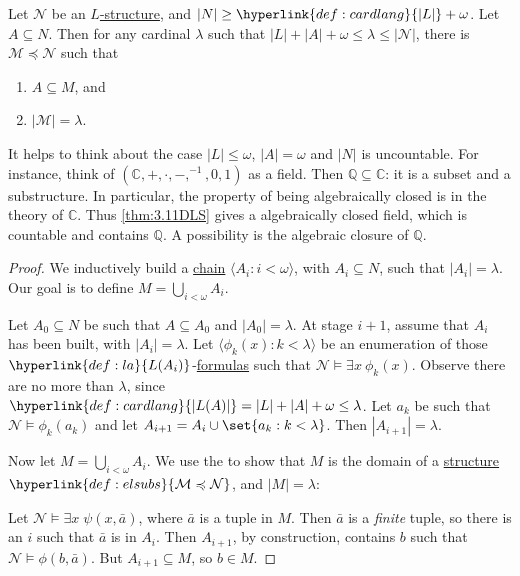 \documentclass{article}
\let\models\vDash
\begin{document}
\begin{nthm}\label{thm:3.11DLS}
  Let $\mathcal{N}$ be an \hyperlink{def:str}{$L$-structure}, and $|N| \geq \hyperlink{def:cardlang}{|L|} + \omega$.
  Let $A \subseteq N$.
  Then for any cardinal $\lambda$ such that $|L| + |A| + \omega \leq \lambda \leq |\mathcal{N}|$, there is \hyperlink{def:elsubs}{$\mathcal{M} \preccurlyeq \mathcal{N}$} such that
  \begin{enumerate}[label=(\roman*)]
    \item $A \subseteq M$, and
    \item $|\mathcal{M}| = \lambda$.
  \end{enumerate}
\end{nthm}
It helps to think about the case $|L| \leq \omega$, $|A| = \omega$ and $|N|$ is uncountable.
For instance, think of $(\mathbb{C}, + , \cdot, -, ^{-1}, 0,1)$ as a field.
Then $\mathbb{Q} \subseteq \mathbb{C}$: it is a subset and a substructure.
In particular, the property of being algebraically closed is in the theory of $\mathbb{C}$.
Thus \cref{thm:3.11DLS} gives a algebraically closed field, which is countable and contains $\mathbb{Q}$. A possibility is the algebraic closure of $\mathbb{Q}$.

\begin{proof}
  We inductively build a \hyperlink{def:chain}{chain} $\langle A_i  : i < \omega \rangle$, with $A_i \subseteq N$, such that $|A_i| = \lambda$.
  Our goal is to define $M = \bigcup_{i < \omega} A_i$.

  Let $A_0 \subseteq N$ be such that $A \subseteq A_0$ and $|A_0| = \lambda$.
  At stage $i+1$, assume that $A_i$ has been built, with $|A_i| = \lambda$.
  Let $\langle \phi_k(x) : k < \lambda  \rangle$ be an enumeration of those $\hyperlink{def:la}{L(A_i)}$-\hyperlink{def:form}{formulas} such that $\mathcal{N} \models \exists x \ \phi_k(x)$. Observe there are no more than $\lambda$, since $\hyperlink{def:cardlang}{|L(A)|} = |L| + |A| + \omega \leq \lambda$.
  Let $a_k$ be such that $\mathcal{N} \models \phi_k(a_k)$ and let $A_{i+1} = A_i \cup \set{a_k : k < \lambda}$.
  Then $|A_{i+1}| = \lambda$.

  Now let $M = \bigcup_{i < \omega} A_i$.
  We use the  to show that $M$ is the domain of a \hyperlink{def:str}{structure} $\hyperlink{def:elsubs}{\mathcal{M} \preccurlyeq \mathcal{N}}$, and $|M| = \lambda$:

  Let $\mathcal{N} \models \exists x \; \psi(x,\bar{a})$, where $\bar{a}$ is a tuple in $M$.
  Then $\bar{a}$ is a \emph{finite} tuple, so there is an $i$ such that $\bar{a}$ is in $A_i$.
  Then $A_{i+1}$, by construction, contains $b$ such that $\mathcal{N} \models \phi(b, \bar{a})$.
  But $A_{i+1} \subseteq M$, so $b \in M$.
\end{proof}
\end{document}
